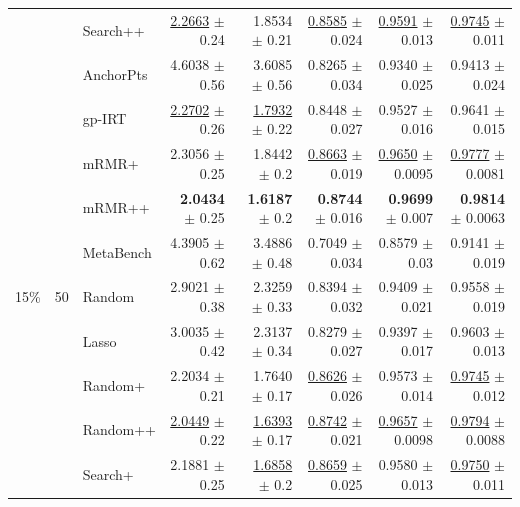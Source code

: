 \begin{longtable}{llp{}rrrrr}
 &  & Search++ & \underline{2.2663} {\scriptsize $\pm$ 0.24} & 1.8534 {\scriptsize $\pm$ 0.21} & \underline{0.8585} {\scriptsize $\pm$ 0.024} & \underline{0.9591} {\scriptsize $\pm$ 0.013} & \underline{0.9745} {\scriptsize $\pm$ 0.011} \\
 &  & AnchorPts & 4.6038 {\scriptsize $\pm$ 0.56} & 3.6085 {\scriptsize $\pm$ 0.56} & 0.8265 {\scriptsize $\pm$ 0.034} & 0.9340 {\scriptsize $\pm$ 0.025} & 0.9413 {\scriptsize $\pm$ 0.024} \\
 &  & gp-IRT & \underline{2.2702} {\scriptsize $\pm$ 0.26} & \underline{1.7932} {\scriptsize $\pm$ 0.22} & 0.8448 {\scriptsize $\pm$ 0.027} & 0.9527 {\scriptsize $\pm$ 0.016} & 0.9641 {\scriptsize $\pm$ 0.015} \\
 &  & mRMR+ & 2.3056 {\scriptsize $\pm$ 0.25} & 1.8442 {\scriptsize $\pm$ 0.2} & \underline{0.8663} {\scriptsize $\pm$ 0.019} & \underline{0.9650} {\scriptsize $\pm$ 0.0095} & \underline{0.9777} {\scriptsize $\pm$ 0.0081} \\
 &  & mRMR++ & \textbf{2.0434} {\scriptsize $\pm$ 0.25} & \textbf{1.6187} {\scriptsize $\pm$ 0.2} & \textbf{0.8744} {\scriptsize $\pm$ 0.016} & \textbf{0.9699} {\scriptsize $\pm$ 0.007} & \textbf{0.9814} {\scriptsize $\pm$ 0.0063} \\
 &  & MetaBench & 4.3905 {\scriptsize $\pm$ 0.62} & 3.4886 {\scriptsize $\pm$ 0.48} & 0.7049 {\scriptsize $\pm$ 0.034} & 0.8579 {\scriptsize $\pm$ 0.03} & 0.9141 {\scriptsize $\pm$ 0.019} \\
\midrule
15\% & 50 & Random & 2.9021 {\scriptsize $\pm$ 0.38} & 2.3259 {\scriptsize $\pm$ 0.33} & 0.8394 {\scriptsize $\pm$ 0.032} & 0.9409 {\scriptsize $\pm$ 0.021} & 0.9558 {\scriptsize $\pm$ 0.019} \\
 &  & Lasso & 3.0035 {\scriptsize $\pm$ 0.42} & 2.3137 {\scriptsize $\pm$ 0.34} & 0.8279 {\scriptsize $\pm$ 0.027} & 0.9397 {\scriptsize $\pm$ 0.017} & 0.9603 {\scriptsize $\pm$ 0.013} \\
 &  & Random+ & 2.2034 {\scriptsize $\pm$ 0.21} & 1.7640 {\scriptsize $\pm$ 0.17} & \underline{0.8626} {\scriptsize $\pm$ 0.026} & 0.9573 {\scriptsize $\pm$ 0.014} & \underline{0.9745} {\scriptsize $\pm$ 0.012} \\
 &  & Random++ & \underline{2.0449} {\scriptsize $\pm$ 0.22} & \underline{1.6393} {\scriptsize $\pm$ 0.17} & \underline{0.8742} {\scriptsize $\pm$ 0.021} & \underline{0.9657} {\scriptsize $\pm$ 0.0098} & \underline{0.9794} {\scriptsize $\pm$ 0.0088} \\
 &  & Search+ & 2.1881 {\scriptsize $\pm$ 0.25} & \underline{1.6858} {\scriptsize $\pm$ 0.2} & \underline{0.8659} {\scriptsize $\pm$ 0.025} & 0.9580 {\scriptsize $\pm$ 0.013} & \underline{0.9750} {\scriptsize $\pm$ 0.011} \\

\end{longtable}
